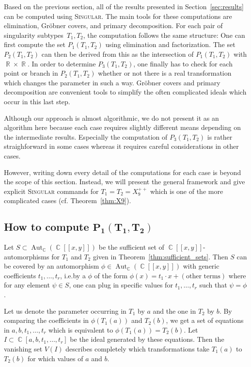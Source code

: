 \documentclass[noend]{amsproc}
\theoremstyle{definition}
\newcommand{\Singular}{\textsc{Singular}}
\DeclareMathOperator{\R}{\mathbb{R}}
\DeclareMathOperator{\C}{\mathbb{C}}
\DeclareMathOperator{\Aut}{Aut}
\begin{document}
Based on the previous section, all of the results presented in
Section~\ref{sec:results} can be computed using \Singular{}. The main tools for
these computations are elimination, Gr\"obner covers, and primary
decomposition. For each pair of singularity subtypes~$T_1, T_2$, the
computation follows the same structure: One can first compute the set
$P_1(T_1, T_2)$ using elimination and factorization. The set $P_2(T_1, T_2)$
can then be derived from this as the intersection of $P_1(T_1, T_2)$ with
$\R \times \R$. In order to determine $P_3(T_1, T_2)$, one finally has to check
for each point or branch in $P_2(T_1, T_2)$ whether or not there is a real
transformation which changes the parameter in such a way. Gr\"obner covers and
primary decomposition are convenient tools to simplify the often complicated
ideals which occur in this last step.

Although our approach is almost algorithmic, we do not present it as an
algorithm here because each case requires slightly different means depending on
the intermediate results. Especially the computation of $P_3(T_1, T_2)$ is
rather straighforward in some cases whereas it requires careful considerations
in other cases.

However, writing down every detail of the computations for each case is beyond
the scope of this section. Instead, we will present the general framework and
give explicit \Singular{} commands for $T_1 = T_2 = X_9^{++}$ which is one of
the more complicated cases (cf. Theorem~\ref{thm:X9}).


\subsection{How to compute $\boldsymbol{P_1(T_1, T_2)}$}%
\label{sec:computing_P1}

Let $S \subset \Aut_{\C}(\C[[x,y]])$ be the sufficient set of
$\C[[x,y]]$-automorphisms for $T_1$ and $T_2$ given in
Theorem~\ref{thm:sufficient_sets}. Then $S$ can be covered by an automorphism
$\phi \in \Aut_{\C}(\C[[x,y]])$ with generic coefficients $t_1, \ldots, t_r$,
i.e.\@ by a $\phi$ of the form $\phi(x) = t_1 \cdot x + (\text{other terms})$
where for any element $\psi \in S$, one can plug in specific values for
$t_1, \ldots, t_r$ such that $\psi = \phi$.

Let us denote the parameter occurring in $T_1$ by $a$ and the one in $T_2$ by
$b$. By comparing the coefficients in $\phi(T_1(a))$ and $T_2(b)$, we get a set
of equations in $a, b, t_1, \ldots, t_r$ which is equivalent to
$\phi(T_1(a)) = T_2(b)$. Let $I \subset \C[a,b,t_1,\ldots,t_r]$ be the ideal
generated by these equations. Then the vanishing set $V(I)$ describes
completely which transformations take $T_1(a)$ to $T_2(b)$ for which values of
$a$ and $b$.
\end{document}
